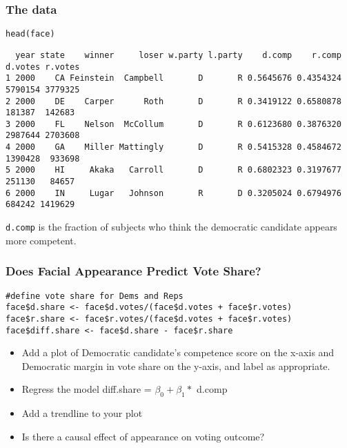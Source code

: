 \documentclass[handout,compress]{beamer}
\begin{document}
\begin{frame}[fragile]
 \frametitle{The data}
\begin{shaded}
\begin{verbatim}
head(face)
\end{verbatim}
\end{shaded}
\begin{scriptsize}
\begin{verbatim}
  year state    winner     loser w.party l.party    d.comp    r.comp d.votes r.votes
1 2000    CA Feinstein  Campbell       D       R 0.5645676 0.4354324 5790154 3779325
2 2000    DE    Carper      Roth       D       R 0.3419122 0.6580878  181387  142683
3 2000    FL    Nelson  McCollum       D       R 0.6123680 0.3876320 2987644 2703608
4 2000    GA    Miller Mattingly       D       R 0.5415328 0.4584672 1390428  933698
5 2000    HI     Akaka   Carroll       D       R 0.6802323 0.3197677  251130   84657
6 2000    IN     Lugar   Johnson       R       D 0.3205024 0.6794976  684242 1419629
\end{verbatim}
\end{scriptsize} \bigskip
\texttt{d.comp} is the fraction of subjects who think the democratic candidate appears more competent. 
\end{frame}

\begin{frame}[fragile]
 \frametitle{Does Facial Appearance Predict Vote Share?}
 \begin{shaded}
 \begin{small}
\begin{verbatim}
#define vote share for Dems and Reps
face$d.share <- face$d.votes/(face$d.votes + face$r.votes)
face$r.share <- face$r.votes/(face$d.votes + face$r.votes)
face$diff.share <- face$d.share - face$r.share
\end{verbatim}
\end{small}
\end{shaded}
\begin{itemize}
	\item Add a plot of Democratic candidate's competence score on the x-axis and Democratic margin in vote share on the y-axis, and label as appropriate.
	\item Regress the model diff.share = $\beta_0 + \beta_1 *$ d.comp
	\item Add a trendline to your plot
	\item Is there a causal effect of appearance on voting outcome?
\end{itemize}
\end{frame}
\end{document}
